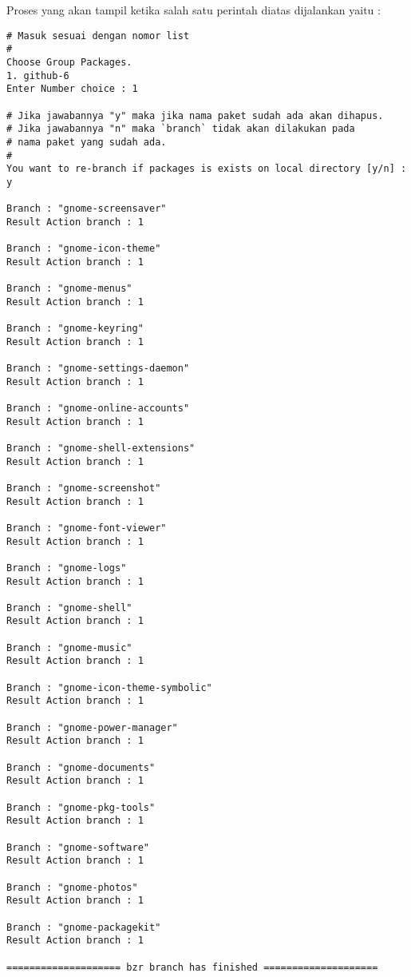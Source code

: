 {\noindent
Proses yang akan tampil ketika salah satu perintah diatas dijalankan yaitu :

\begin{lstlisting}[language=ShellBash2]
# Masuk sesuai dengan nomor list
#
Choose Group Packages.
1. github-6
Enter Number choice : 1

# Jika jawabannya "y" maka jika nama paket sudah ada akan dihapus.
# Jika jawabannya "n" maka `branch` tidak akan dilakukan pada 
# nama paket yang sudah ada.
#
You want to re-branch if packages is exists on local directory [y/n] : y

Branch : "gnome-screensaver"
Result Action branch : 1

Branch : "gnome-icon-theme"
Result Action branch : 1

Branch : "gnome-menus"
Result Action branch : 1

Branch : "gnome-keyring"
Result Action branch : 1

Branch : "gnome-settings-daemon"
Result Action branch : 1

Branch : "gnome-online-accounts"
Result Action branch : 1

Branch : "gnome-shell-extensions"
Result Action branch : 1

Branch : "gnome-screenshot"
Result Action branch : 1

Branch : "gnome-font-viewer"
Result Action branch : 1

Branch : "gnome-logs"
Result Action branch : 1

Branch : "gnome-shell"
Result Action branch : 1

Branch : "gnome-music"
Result Action branch : 1

Branch : "gnome-icon-theme-symbolic"
Result Action branch : 1

Branch : "gnome-power-manager"
Result Action branch : 1

Branch : "gnome-documents"
Result Action branch : 1

Branch : "gnome-pkg-tools"
Result Action branch : 1

Branch : "gnome-software"
Result Action branch : 1

Branch : "gnome-photos"
Result Action branch : 1

Branch : "gnome-packagekit"
Result Action branch : 1

==================== bzr branch has finished ====================

\end{lstlisting}

}
